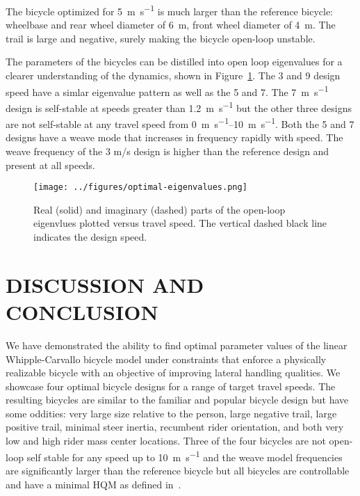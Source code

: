 \documentclass{bmd2019p}
\begin{document}
The bicycle optimized for 5~\si{\meter\per\second} is much larger than the
reference bicycle: wheelbase and rear wheel diameter of 6~\si{\meter}, front
wheel diameter of 4~\si{\meter}. The trail is large and negative, surely making
the bicycle open-loop unstable.

The parameters of the bicycles can be distilled into open loop eigenvalues for
a clearer understanding of the dynamics, shown in
Figure~\ref{fig:optimal-eigenvalues}. The 3 and 9 design speed have a simlar
eigenvalue pattern as well as the 5 and 7. The 7~\si{\meter\per\second} design
is self-stable at speeds greater than 1.2~\si{\meter\per\second} but the other
three designs are not self-stable at any travel speed from
\SIrange{0}{10}{\meter\per\second}. Both the 5 and 7 designs have a weave mode
that increases in frequency rapidly with speed. The weave frequency of the 3
m/s design is higher than the reference design and present at all speeds.
%
\begin{figure}
  \centering
  \texttt{[image: ../figures/optimal-eigenvalues.png]}
  \label{fig:optimal-eigenvalues}
  \caption{Real (solid) and imaginary (dashed) parts of the open-loop eigenvlues plotted versus
    travel speed. The vertical dashed black line indicates the design speed.}
\end{figure}

\section{DISCUSSION AND CONCLUSION}
%
We have demonstrated the ability to find optimal parameter values of the linear
Whipple-Carvallo bicycle model under constraints that enforce a physically
realizable bicycle with an objective of improving lateral handling qualities.
We showcase four optimal bicycle designs for a range of target travel speeds.
The resulting bicycles are similar to the familiar and popular bicycle design
but have some oddities: very large size relative to the person, large negative
trail, large positive trail, minimal steer inertia, recumbent rider
orientation, and both very low and high rider mass center locations. Three of
the four bicycles are not open-loop self stable for any speed up to
10~\si{\meter\per\second} and the weave model frequencies are significantly
larger than the reference bicycle but all bicycles are controllable and have a
minimal HQM as defined in~\cite{Hess2012}.
\end{document}
